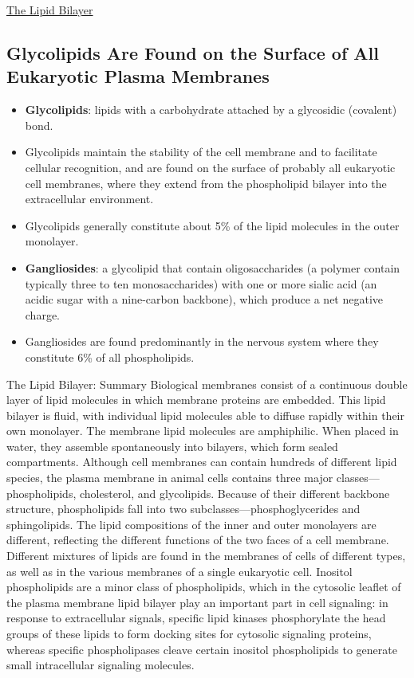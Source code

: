 \documentclass[12pt,letterpaper]{article}
\begin{document}
\begin{secbox}{\hyperlink{10}{The Lipid Bilayer}}
{    \subsection*{Glycolipids Are Found on the Surface of All Eukaryotic Plasma Membranes}
    \begin{itemize}
        \item \textbf{Glycolipids}: lipids with a carbohydrate attached by a glycosidic (covalent) bond.
        \item Glycolipids maintain the stability of the cell membrane and to facilitate cellular recognition, and are found on the surface of probably all eukaryotic cell membranes, where they extend from the phospholipid bilayer into the extracellular environment. 
        \item Glycolipids generally constitute about 5\% of the lipid molecules in the outer monolayer. 
        \item \textbf{Gangliosides}: a glycolipid that contain oligosaccharides (a polymer contain typically three to ten monosaccharides) with one or more sialic acid (an acidic sugar with a nine-carbon backbone), which produce a net negative charge.
        \item  Gangliosides are found predominantly in the nervous system where they constitute 6\% of all phospholipids.
    \end{itemize}

    \begin{probbox}{The Lipid Bilayer: Summary}
        Biological membranes consist of a continuous double layer of lipid molecules in which membrane proteins are embedded. This lipid bilayer is fluid, with individual lipid molecules able to diffuse rapidly within their own monolayer. The membrane lipid molecules are amphiphilic. When placed in water, they assemble spontaneously into bilayers, which form sealed compartments. Although cell membranes can contain hundreds of different lipid species, the plasma membrane in animal cells contains three major classes—phospholipids, cholesterol, and glycolipids. Because of their different backbone structure, phospholipids fall into two subclasses—phosphoglycerides and sphingolipids. The lipid compositions of the inner and outer monolayers are different, reflecting the different functions of the two faces of a cell membrane. Different mixtures of lipids are found in the membranes of cells of different types, as well as in the various membranes of a single eukaryotic cell. Inositol phospholipids are a minor class of phospholipids, which in the cytosolic leaflet of the plasma membrane lipid bilayer play an important part in cell signaling: in response to extracellular signals, specific lipid kinases phosphorylate the head groups of these lipids to form docking sites for cytosolic signaling proteins, whereas specific phospholipases cleave certain inositol phospholipids to generate small intracellular signaling molecules.
    \end{probbox}
}\end{secbox}
\end{document}
